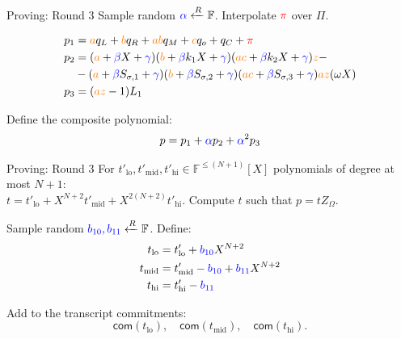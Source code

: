 \documentclass{zkdl-presentation-template}
\begin{document}
    \begin{frame} {Proving: Round 3}
        Sample random $\textcolor{blue}{\alpha} \xleftarrow{R} \mathbb{F}$.
        Interpolate $\textcolor{red}{\pi}$ over $\Pi$.
    
        \begin{align*}
        p_1 &= \textcolor{orange}{a}q_L + \textcolor{orange}{b}q_R + \textcolor{orange}{ab}q_M + \textcolor{orange}{c}q_o + q_C + \textcolor{red}{\pi} \\
        p_2 &= (\textcolor{orange}{a} + \textcolor{blue}{\beta} X + \textcolor{blue}{\gamma})(\textcolor{orange}{b} + \textcolor{blue}{\beta} k_1 X + \textcolor{blue}{\gamma})(\textcolor{orange}{ac} + \textcolor{blue}{\beta} k_2 X + \textcolor{blue}{\gamma})\textcolor{orange}{z} - \\
            &- (\textcolor{orange}{a} + \textcolor{blue}{\beta} S_{\sigma,1} + \textcolor{blue}{\gamma})(\textcolor{orange}{b} + \textcolor{blue}{\beta} S_{\sigma,2} + \textcolor{blue}{\gamma})(\textcolor{orange}{ac} + \textcolor{blue}{\beta} S_{\sigma,3} + \textcolor{blue}{\gamma})\textcolor{orange}{az}(\omega X) \\
        p_3 &= (\textcolor{orange}{az} - 1)L_1
        \end{align*}

        Define the composite polynomial:
        \begin{equation*}
            p = p_1 + \textcolor{blue}{\alpha} p_2 + \textcolor{blue}{\alpha}^2 p_3
        \end{equation*}
    \end{frame}

    \begin{frame} {Proving: Round 3}
        For $t'_{\text{lo}}, t'_{\text{mid}}, t'_{\text{hi}} \in \mathbb{F}^{\leq (N+1)}[X]$ polynomials of degree at most $N+1$: \\
        \vspace{1em}
        $t = t'_{\text{lo}} + X^{N+2}t'_{\text{mid}} + X^{2(N+2)}t'_{\text{hi}}$.
        Compute $t$ such that $p = tZ_{\Omega}$.
        
        Sample random $\textcolor{blue}{b_{10}, b_{11}} \xleftarrow{R} \mathbb{F}$. Define:
        \begin{align*}
            t_{\text{lo}} &= t'_{\text{lo}} + \textcolor{blue}{b_{10}}X^{N+2} \\
            t_{\text{mid}} &= t'_{\text{mid}} - \textcolor{blue}{b_{10}} + \textcolor{blue}{b_{11}}X^{N+2} \\
            t_{\text{hi}} &= t'_{\text{hi}} - \textcolor{blue}{b_{11}}
        \end{align*}

        Add to the transcript commitments: 
        \begin{equation*}
            \mathsf{com}(t_{\text{lo}}), \quad \mathsf{com}(t_{\text{mid}}), \quad \mathsf{com}(t_{\text{hi}}).
        \end{equation*}
    \end{frame}
\end{document}
